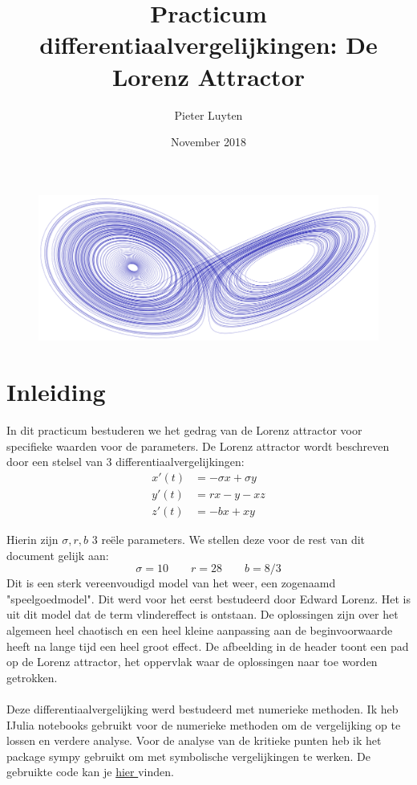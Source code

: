 \documentclass[12pt, a4paper]{article}
\title{Practicum differentiaalvergelijkingen: De Lorenz Attractor}
\author{Pieter Luyten}
\date{November 2018}
\theoremstyle{definition}
\begin{document}
\maketitle

\begin{figure}[H]
    \centering
    \includegraphics[width=0.9\linewidth]{header_verslag.png}
\end{figure}

\section{Inleiding}
In dit practicum bestuderen we het gedrag van de Lorenz attractor voor specifieke waarden voor de parameters. De Lorenz attractor wordt beschreven door een stelsel van 3 differentiaalvergelijkingen:
\begin{align}
    x'(t) &= -\sigma x + \sigma y \nonumber \\
    y'(t) &= r x -y -xz \label{eq:stelses_lorenz}\\
    z'(t) &= -bx +xy \nonumber
\end{align}

Hierin zijn $\sigma, r, b$ 3 reële parameters. We stellen deze voor de rest van dit document gelijk aan:
$$\sigma = 10 \qquad r=28 \qquad b = 8/3$$
Dit is een sterk vereenvoudigd model van het weer, een zogenaamd "speelgoedmodel". Dit werd voor het eerst bestudeerd door Edward Lorenz. Het is uit dit model dat de term vlindereffect is ontstaan. De oplossingen zijn over het algemeen heel chaotisch en een heel kleine aanpassing aan de beginvoorwaarde heeft na lange tijd een heel groot effect. De afbeelding in de header toont een pad op de Lorenz attractor, het oppervlak waar de oplossingen naar toe worden getrokken.\\
\\
Deze differentiaalvergelijking werd bestudeerd met numerieke methoden. Ik heb IJulia notebooks gebruikt voor de numerieke methoden om de vergelijking op te lossen en verdere analyse. Voor de analyse van de kritieke punten heb ik het package sympy gebruikt om met symbolische vergelijkingen te werken. De gebruikte code kan je \href{https://nbviewer.jupyter.org/github/Cubedsheep/practicum-diff-Julia/blob/master/practicum%20-%20Julia.ipynb?fbclid=IwAR0w5uD6396VRiiF5jM1AxzXG7EB4HG5WAsDRnNsDRpx_s_2yaZP3bjLWWA}{hier
} vinden.
\end{document}

